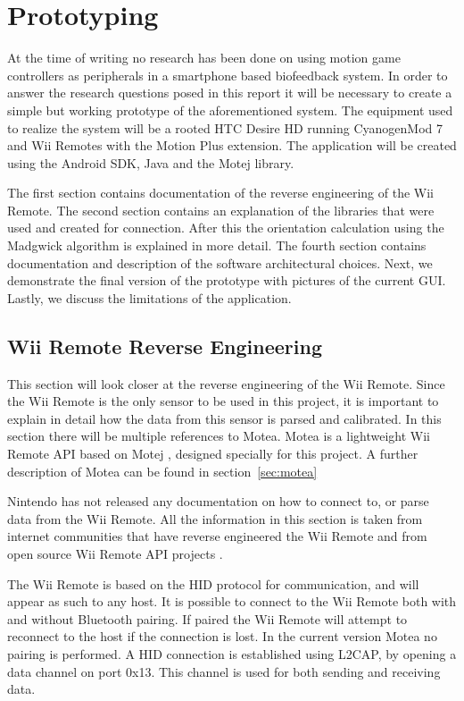 \chapter{Prototyping}
At the time of writing no research has been done on using motion game controllers as peripherals in a smartphone based biofeedback system. In order to answer the research questions posed in this report it will be necessary to create a simple but working prototype of the aforementioned system. The equipment used to realize the system will be a rooted HTC Desire HD \cite{desireHdSpecs} running CyanogenMod 7 \cite{cyanogenmod} and Wii Remotes with the Motion Plus extension. The application will be created using the Android SDK, Java and the Motej library.

The first section contains documentation of the reverse engineering of the Wii Remote. The second section contains an explanation of the libraries that were used and created for connection. After this the orientation calculation using the Madgwick algorithm is explained in more detail. The fourth section contains documentation and description of the software architectural choices. Next, we demonstrate the final version of the prototype with pictures of the current GUI. Lastly, we discuss the limitations of the application.

\section{Wii Remote Reverse Engineering}
This section will look closer at the reverse engineering of the Wii Remote. Since the Wii Remote is the only sensor to be used in this project, it is important to explain in detail how the data from this sensor is parsed and calibrated. In this section there will be multiple references to Motea. Motea is a lightweight Wii Remote API based on Motej \cite{Motej}, designed specially for this project. A further description of Motea can be found in section~\ref{sec:motea}

Nintendo has not released any documentation on how to connect to, or parse data from the Wii Remote. All the information in this section is taken from internet communities \cite{wiiBrew} that have reverse engineered the Wii Remote and from open source Wii Remote API projects \cite{wiiMoteLib, Motej}.

The Wii Remote is based on the HID protocol for communication, and will appear as such to any host. It is possible to connect to the Wii Remote both with and without Bluetooth pairing. If paired the Wii Remote will attempt to reconnect to the host if the connection is lost. In the current version Motea no pairing is performed. A HID connection is established using L2CAP, by opening a data channel on port 0x13. This channel is used for both sending and receiving data.

